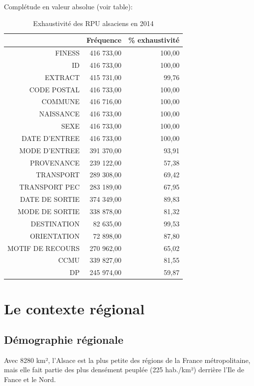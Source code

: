 \documentclass[]{article}
\begin{document}
Complétude en valeur absolue (voir table):

\begin{table}[ht]
\centering
\begin{tabular}{rrr}
  \hline
 & Fréquence & \% exhaustivité \\ 
  \hline
FINESS & 416 733,00 & 100,00 \\ 
  ID & 416 733,00 & 100,00 \\ 
  EXTRACT & 415 731,00 & 99,76 \\ 
  CODE POSTAL & 416 733,00 & 100,00 \\ 
  COMMUNE & 416 716,00 & 100,00 \\ 
  NAISSANCE & 416 733,00 & 100,00 \\ 
  SEXE & 416 733,00 & 100,00 \\ 
  DATE D'ENTREE & 416 733,00 & 100,00 \\ 
  MODE D'ENTREE & 391 370,00 & 93,91 \\ 
  PROVENANCE & 239 122,00 & 57,38 \\ 
  TRANSPORT & 289 308,00 & 69,42 \\ 
  TRANSPORT PEC & 283 189,00 & 67,95 \\ 
  DATE DE SORTIE & 374 349,00 & 89,83 \\ 
  MODE DE SORTIE & 338 878,00 & 81,32 \\ 
  DESTINATION & 82 635,00 & 99,53 \\ 
  ORIENTATION & 72 898,00 & 87,80 \\ 
  MOTIF DE RECOURS & 270 962,00 & 65,02 \\ 
  CCMU & 339 827,00 & 81,55 \\ 
  DP & 245 974,00 & 59,87 \\ 
   \hline
\end{tabular}
\caption{Exhaustivité des RPU alsaciens en 2014} 
\end{table}

\section{Le contexte régional}\label{le-contexte-regional}

\subsection{Démographie régionale}\label{demographie-regionale}

Avec 8280 km², l'Alsace est la plus petite des régions de la France
métropolitaine, mais elle fait partie des plus densément peuplée (225
hab./km²) derrière l'Ile de Fance et le Nord.
\end{document}
